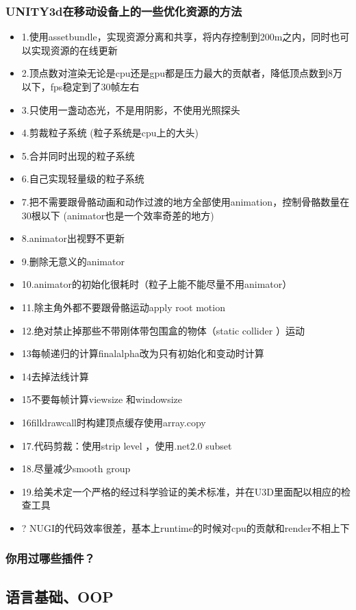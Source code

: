 \documentclass[9pt, b5paper]{article}
\begin{document}
\subsubsection{UNITY3d在移动设备上的一些优化资源的方法}
\label{sec:orgb040034}
\begin{itemize}
\item 1.使用assetbundle，实现资源分离和共享，将内存控制到200m之内，同时也可以实现资源的在线更新
\item 2.顶点数对渲染无论是cpu还是gpu都是压力最大的贡献者，降低顶点数到8万以下，fps稳定到了30帧左右
\item 3.只使用一盏动态光，不是用阴影，不使用光照探头
\item 4.剪裁粒子系统 (粒子系统是cpu上的大头)
\item 5.合并同时出现的粒子系统
\item 6.自己实现轻量级的粒子系统
\item 7.把不需要跟骨骼动画和动作过渡的地方全部使用animation，控制骨骼数量在30根以下 (animator也是一个效率奇差的地方)
\item 8.animator出视野不更新
\item 9.删除无意义的animator
\item 10.animator的初始化很耗时（粒子上能不能尽量不用animator）
\item 11.除主角外都不要跟骨骼运动apply root motion
\item 12.绝对禁止掉那些不带刚体带包围盒的物体（static collider ）运动
\item 13每帧递归的计算finalalpha改为只有初始化和变动时计算
\item 14去掉法线计算
\item 15不要每帧计算viewsize 和windowsize
\item 16filldrawcall时构建顶点缓存使用array.copy
\item 17.代码剪裁：使用strip level ，使用.net2.0 subset
\item 18.尽量减少smooth group
\item 19.给美术定一个严格的经过科学验证的美术标准，并在U3D里面配以相应的检查工具
\item ? NUGI的代码效率很差，基本上runtime的时候对cpu的贡献和render不相上下
\end{itemize}
\subsubsection{你用过哪些插件？}
\label{sec:org1bcc78f}


\subsection{语言基础、OOP}
\label{sec:org7724d02}
\end{document}
